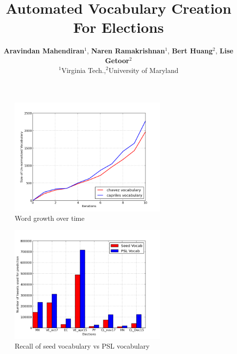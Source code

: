\documentclass[letterpaper]{article}
\begin{document}
\title{Automated Vocabulary Creation For Elections}
\author{{\bf Aravindan Mahendiran}$^{1}$, {\bf Naren Ramakrishnan}$^{1}$, 
             {\bf Bert Huang}$^{2}$, {\bf Lise Getoor}$^{2}$\\
              $^1$Virginia Tech.,$^2$University of Maryland}
\maketitle



\begin{figure}[Ht]
	\centering
	\includegraphics[width=0.7\textwidth, height=0.3\textheight]{support_files/WordGrowth.png}
	\vspace{-1em}
	\caption{Word growth over time}
	\label{fig:wordgrowth}
	\vspace{-1em}
\end{figure}


\begin{figure}[Ht]
	\centering
	\includegraphics[width=0.7\textwidth, height=0.3\textheight]{support_files/Recall.png}
\vspace{-1em}
	\caption{Recall of seed vocabulary vs PSL vocabulary}
	\label{fig:recall}
	\vspace{-1em}
\end{figure}
\end{document}
